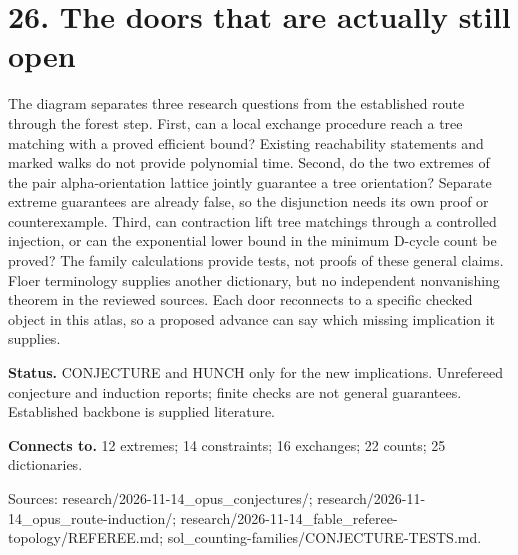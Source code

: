 \section*{26. The doors that are actually still open}
\begin{center}\begin{minipage}{.86\textwidth}\centering
{}
\end{minipage}\end{center}
The diagram separates three research questions from the established route through the forest step. First, can a local exchange procedure reach a tree matching with a proved efficient bound? Existing reachability statements and marked walks do not provide polynomial time. Second, do the two extremes of the pair alpha-orientation lattice jointly guarantee a tree orientation? Separate extreme guarantees are already false, so the disjunction needs its own proof or counterexample. Third, can contraction lift tree matchings through a controlled injection, or can the exponential lower bound in the minimum D-cycle count be proved? The family calculations provide tests, not proofs of these general claims. Floer terminology supplies another dictionary, but no independent nonvanishing theorem in the reviewed sources. Each door reconnects to a specific checked object in this atlas, so a proposed advance can say which missing implication it supplies.

\textbf{Status.} CONJECTURE and HUNCH only for the new implications. Unrefereed conjecture and induction reports; finite checks are not general guarantees. Established backbone is supplied literature.

\textbf{Connects to.} 12 extremes; 14 constraints; 16 exchanges; 22 counts; 25 dictionaries.

{\footnotesize\raggedright Sources: research/\allowbreak{}2026-11-14\_opus\_conjectures/\allowbreak{};\allowbreak{} research/\allowbreak{}2026-11-14\_opus\_route-induction/\allowbreak{};\allowbreak{} research/\allowbreak{}2026-11-14\_fable\_referee-topology/\allowbreak{}REFEREE.md;\allowbreak{} sol\_counting-families/\allowbreak{}CONJECTURE-TESTS.md.\par}
